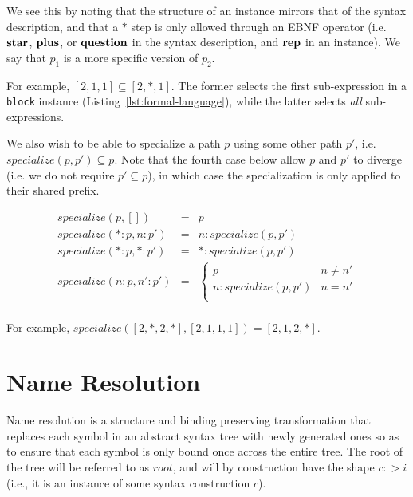 \documentclass{kththesis}
\begin{document}
We see this by noting that the structure of an instance mirrors that of the syntax description, and that a $*$ step is only allowed through an EBNF operator (i.e. $\mathrel{\mathbf{star}}$, $\mathrel{\mathbf{plus}}$, or $\mathrel{\mathbf{question}}$ in the syntax description, and $\mathrel{\mathbf{rep}}$ in an instance). We say that $p_1$ is a more specific version of $p_2$.

For example, $[2, 1, 1] \subseteq [2, *, 1]$. The former selects the first sub-expression in a \texttt{block} instance (Listing~\ref{lst:formal-language}), while the latter selects \emph{all} sub-expressions.

\newcommand{\specialize}{\ensuremath{\mathit{specialize}}}

We also wish to be able to specialize a path $p$ using some other path $p'$, i.e. $\specialize(p, p') \subseteq p$. Note that the fourth case below allow $p$ and $p'$ to diverge (i.e. we do not require $p' \subseteq p$), in which case the specialization is only applied to their shared prefix.

$$
\begin{array}{rcl}
\specialize(p, []) & = & p \\
\specialize(*:p, n:p') & = & n : \specialize(p, p') \\
\specialize(*:p, *:p') & = & * : \specialize(p, p') \\
\specialize(n:p, n':p') & = &
\begin{cases}
  p & n \neq n' \\
  n : \specialize(p, p') & n = n' \\
\end{cases} \\
\end{array}
$$

For example, $\specialize([2, *, 2, *], [2, 1, 1, 1]) = [2, 1, 2, *]$.

\section{Name Resolution} \label{sec:name-resolution}

\newcommand{\rooti}{\ensuremath{\mathit{root}}}

Name resolution is a structure and binding preserving transformation that replaces each symbol in an abstract syntax tree with newly generated ones so as to ensure that each symbol is only bound once across the entire tree. The root of the tree will be referred to as \rooti, and will by construction have the shape $c :> i$ (i.e., it is an instance of some syntax construction $c$).
\end{document}
